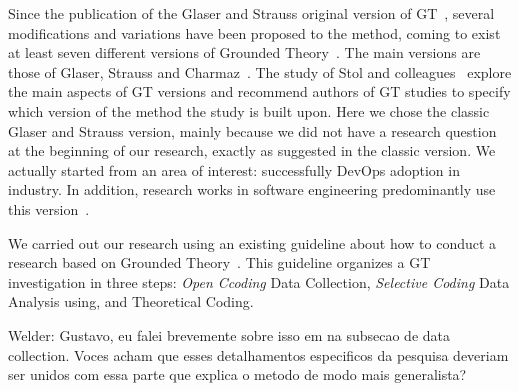 Since the publication of the Glaser and Strauss original version of GT~\cite{glase1967discovery},
several modifications and variations have been proposed to the method, coming to
exist at least seven different versions of Grounded Theory~\cite{denzin2007grounded}.
The main versions are those of Glaser, Strauss and
Charmaz~\cite{stol2016grounded}. The study of Stol and colleagues~\cite{stol2016grounded}
explore the main aspects of GT versions and recommend authors of GT studies to
specify which version of the method the study is built upon. Here we chose the classic
Glaser and Strauss version, mainly because we did not have a research
question at the beginning of our research, exactly as suggested in the classic
version. We actually started from an area of interest: successfully DevOps adoption
in industry. In addition, research works in
software engineering predominantly use this version~\cite{stol2016grounded}.





We carried out our research using an existing
guideline about how to conduct a research based on
Grounded Theory~\cite{adolph2011using}. This guideline organizes
a GT investigation in three steps: \emph{Open Ccoding} Data Collection,
\emph{Selective Coding} Data Analysis using, and Theoretical Coding.

{\color{red} Welder: Gustavo, eu falei brevemente sobre isso em na subsecao de
data collection. Voces acham que esses detalhamentos especificos da pesquisa
deveriam ser unidos com essa parte que explica o metodo de modo mais
generalista?}


